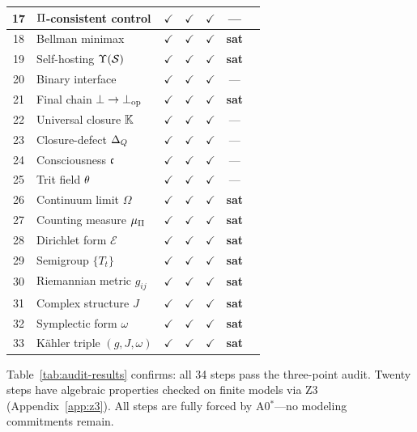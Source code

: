 \begin{table}[t]
\begin{tabular}{@{}cllcccc@{}}
17 & $\Pi$-consistent control   & $\checkmark$ & $\checkmark$ & $\checkmark$ & --- \\
\midrule
18 & Bellman minimax             & $\checkmark$ & $\checkmark$ & $\checkmark$ & \textbf{sat} \\
19 & Self-hosting $\Upsilon(\mathcal{S})$    & $\checkmark$ & $\checkmark$ & $\checkmark$ & \textbf{sat} \\
20 & Binary interface            & $\checkmark$ & $\checkmark$ & $\checkmark$ & --- \\
21 & Final chain $\bot \to \bot_{\mathrm{op}}$ & $\checkmark$ & $\checkmark$ & $\checkmark$ & \textbf{sat} \\
\midrule
22 & Universal closure $\mathbb{K}$  & $\checkmark$ & $\checkmark$ & $\checkmark$ & --- \\
23 & Closure-defect $\Delta_{Q}$ & $\checkmark$ & $\checkmark$ & $\checkmark$ & --- \\
24 & Consciousness $\mathfrak{c}$   & $\checkmark$ & $\checkmark$ & $\checkmark$ & --- \\
25 & Trit field $\theta$     & $\checkmark$ & $\checkmark$ & $\checkmark$ & --- \\
\midrule
26 & Continuum limit $\Omega$     & $\checkmark$ & $\checkmark$ & $\checkmark$ & \textbf{sat} \\
27 & Counting measure $\mu_\Pi$  & $\checkmark$ & $\checkmark$ & $\checkmark$ & \textbf{sat} \\
28 & Dirichlet form $\mathcal{E}$ & $\checkmark$ & $\checkmark$ & $\checkmark$ & \textbf{sat} \\
29 & Semigroup $\{T_t\}$          & $\checkmark$ & $\checkmark$ & $\checkmark$ & \textbf{sat} \\
30 & Riemannian metric $g_{ij}$   & $\checkmark$ & $\checkmark$ & $\checkmark$ & \textbf{sat} \\
31 & Complex structure $J$        & $\checkmark$ & $\checkmark$ & $\checkmark$ & \textbf{sat} \\
32 & Symplectic form $\omega$     & $\checkmark$ & $\checkmark$ & $\checkmark$ & \textbf{sat} \\
33 & K\"{a}hler triple $(g,J,\omega)$ & $\checkmark$ & $\checkmark$ & $\checkmark$ & \textbf{sat} \\
\bottomrule
\end{tabular}
\end{table}

Table~\ref{tab:audit-results} confirms: all 34 steps pass the three-point
audit.  Twenty steps have algebraic properties checked on finite models via
Z3 (Appendix~\ref{app:z3}).  All steps are fully forced by A0$^*$---no
modeling commitments remain.

